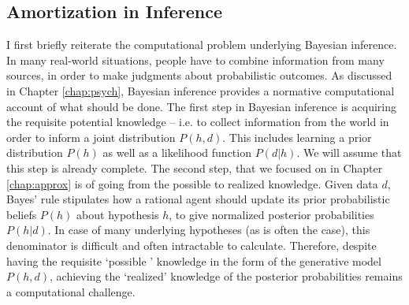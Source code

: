 \subsection{Amortization in Inference}


I first briefly reiterate the computational problem underlying Bayesian inference. In many real-world situations, people have to combine information from many sources, in order to make judgments about probabilistic outcomes. As discussed in Chapter \ref{chap:psych}, Bayesian inference provides a normative computational account of what should be done. The first step in Bayesian inference is acquiring the requisite potential knowledge  -- i.e. to collect information from the world in order to inform a joint distribution $P(h,d)$. This includes learning a prior distribution $P(h)$ as well as a likelihood function $P(d | h)$. We will assume that this step is already complete. The second step, that we focused on in Chapter \ref{chap:approx} is of going from the possible to realized knowledge. Given data $d$, Bayes' rule stipulates how a rational agent should update its prior probabilistic beliefs $P(h)$ about hypothesis $h$, to give normalized posterior probabilities  $P(h |d)$.
In case of many underlying hypotheses (as is often the case), this denominator is difficult and often intractable to calculate. Therefore, despite having the requisite `possible ' knowledge in the form of the generative model $P(h,d)$, achieving the `realized' knowledge of the posterior probabilities remains a computational challenge.

